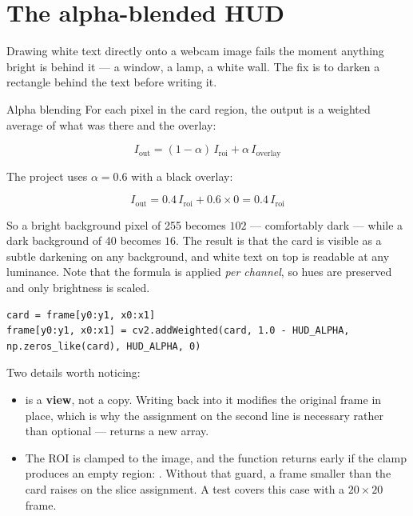 \section{The alpha-blended HUD}
\label{sec:hud}

Drawing white text directly onto a webcam image fails the moment anything bright is behind it --- a
window, a lamp, a white wall. The fix is to darken a rectangle behind the text before writing it.

\begin{mathdeepdive}{Alpha blending}
For each pixel in the card region, the output is a weighted average of what was there and the
overlay:

$$I_{\text{out}} = (1-\alpha)\, I_{\text{roi}} + \alpha\, I_{\text{overlay}}$$

The project uses $\alpha = 0.6$ with a black overlay:

$$I_{\text{out}} = 0.4\, I_{\text{roi}} + 0.6 \times 0 = 0.4\, I_{\text{roi}}$$

So a bright background pixel of 255 becomes $102$ --- comfortably dark --- while a dark background
of 40 becomes $16$. The result is that the card is visible as a subtle darkening on any background,
and white text on top is readable at any luminance. Note that the formula is applied
\emph{per channel}, so hues are preserved and only brightness is scaled.
\end{mathdeepdive}

\begin{codecard}
\begin{lstlisting}
card = frame[y0:y1, x0:x1]
frame[y0:y1, x0:x1] = cv2.addWeighted(card, 1.0 - HUD_ALPHA, np.zeros_like(card), HUD_ALPHA, 0)
\end{lstlisting}
\end{codecard}

Two details worth noticing:

\begin{itemize}
  \item {} is a \textbf{view}, not a copy. Writing back into it modifies the
        original frame in place, which is why the assignment on the second line is necessary rather
        than optional ---  returns a new array.
  \item The ROI is clamped to the image, and the function returns early if the clamp produces an
        empty region:
        . Without that guard, a frame smaller than the
        card raises on the slice assignment. A test covers this case with a $20\times20$ frame.
\end{itemize}

